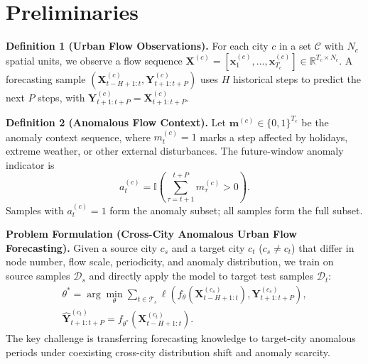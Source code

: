 \section{Preliminaries}

\textbf{Definition 1 (Urban Flow Observations).} For each city $c$ in a set $\mathcal{C}$ with $N_c$ spatial units, we observe a flow sequence $\mathbf{X}^{(c)}=[\mathbf{x}^{(c)}_1,\ldots,\mathbf{x}^{(c)}_{T_c}]\in\mathbb{R}^{T_c\times N_c}$. A forecasting sample $(\mathbf{X}^{(c)}_{t-H+1:t},\mathbf{Y}^{(c)}_{t+1:t+P})$ uses $H$ historical steps to predict the next $P$ steps, with $\mathbf{Y}^{(c)}_{t+1:t+P}=\mathbf{X}^{(c)}_{t+1:t+P}$.

\noindent\textbf{Definition 2 (Anomalous Flow Context).} Let $\mathbf{m}^{(c)}\in\{0,1\}^{T_c}$ be the anomaly context sequence, where $m^{(c)}_t=1$ marks a step affected by holidays, extreme weather, or other external disturbances. The future-window anomaly indicator is
\begin{equation}
    a^{(c)}_t=\mathbb{I}\left(\sum_{\tau=t+1}^{t+P}m^{(c)}_\tau>0\right).
\end{equation}
Samples with $a^{(c)}_t=1$ form the anomaly subset; all samples form the full subset.

\noindent\textbf{Problem Formulation (Cross-City Anomalous Urban Flow Forecasting).} Given a source city $c_s$ and a target city $c_t$ ($c_s\neq c_t$) that differ in node number, flow scale, periodicity, and anomaly distribution, we train on source samples $\mathcal{D}_s$ and directly apply the model to target test samples $\mathcal{D}_t$:
\begin{equation}
\begin{gathered}
    \theta^*=\arg\min_\theta\sum_{t\in\mathcal{T}_s}\ell\left(f_\theta(\mathbf{X}^{(c_s)}_{t-H+1:t}),\mathbf{Y}^{(c_s)}_{t+1:t+P}\right),\\
    \widehat{\mathbf{Y}}^{(c_t)}_{t+1:t+P}=f_{\theta^*}(\mathbf{X}^{(c_t)}_{t-H+1:t}).
\end{gathered}
\end{equation}
The key challenge is transferring forecasting knowledge to target-city anomalous periods under coexisting cross-city distribution shift and anomaly scarcity.